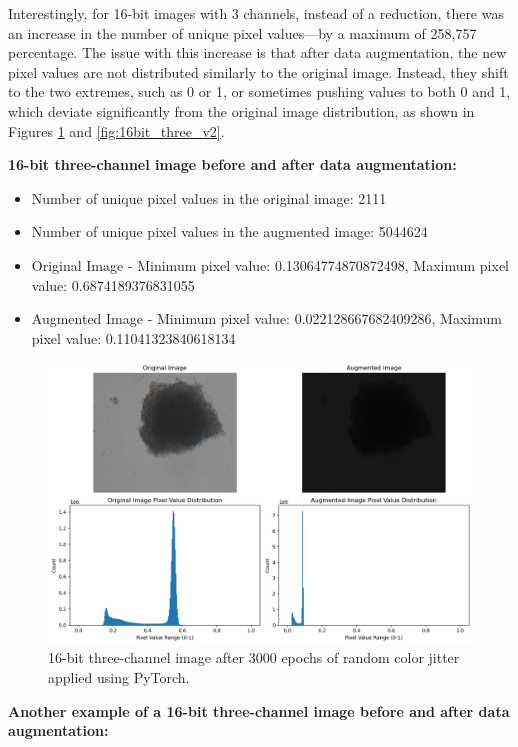 Interestingly, for 16-bit images with 3 channels, instead of a reduction, there was an increase in the number of unique pixel values—by a maximum of 258,757 percentage. 
The issue with this increase is that after data augmentation, the new pixel values are not distributed similarly to the original image. Instead, they shift to
 the two extremes,
 such as 0 or 1, or sometimes pushing values to both 0 and 1, which deviate significantly from the original image distribution, as shown in Figures
  \ref{fig:16bit_three_v1} and \ref{fig:16bit_three_v2}.

  \textbf{16-bit three-channel image before and after data augmentation:}
  \begin{itemize}
    \item Number of unique pixel values in the original image: 2111
    \item Number of unique pixel values in the augmented image: 5044624
    \item Original Image - Minimum pixel value: 0.13064774870872498, Maximum pixel value: 0.6874189376831055
    \item Augmented Image - Minimum pixel value: 0.022128667682409286, Maximum pixel value: 0.11041323840618134
  \end{itemize}
  
  \begin{figure}[H]
    \centering
    \includegraphics[scale=0.5]{figures/16bit_three_1.png} 
    \caption{16-bit three-channel image after 3000 epochs of random color jitter applied using PyTorch.}
    \label{fig:16bit_three_v1}
  \end{figure}
  
  \textbf{Another example of a 16-bit three-channel image before and after data augmentation:}
  
